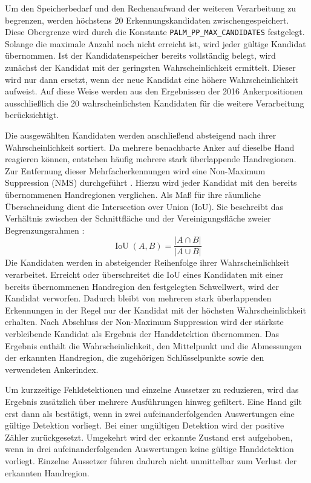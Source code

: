 Um den Speicherbedarf und den Rechenaufwand der weiteren Verarbeitung zu begrenzen, werden höchstens 20 Erkennungskandidaten zwischengespeichert. Diese Obergrenze wird durch die Konstante \texttt{PALM\_PP\_MAX\_CANDIDATES} festgelegt. Solange die maximale Anzahl noch nicht erreicht ist, wird jeder gültige Kandidat übernommen. Ist der Kandidatenspeicher bereits vollständig belegt, wird zunächst der Kandidat mit der geringsten Wahrscheinlichkeit ermittelt. Dieser wird nur dann ersetzt, wenn der neue Kandidat eine höhere Wahrscheinlichkeit aufweist. Auf diese Weise werden aus den Ergebnissen der 2016 Ankerpositionen ausschließlich die 20 wahrscheinlichsten Kandidaten für die weitere Verarbeitung berücksichtigt.

Die ausgewählten Kandidaten werden anschließend absteigend nach ihrer Wahrscheinlichkeit sortiert. Da mehrere benachbarte Anker auf dieselbe Hand reagieren können, entstehen häufig mehrere stark überlappende Handregionen. Zur Entfernung dieser Mehrfacherkennungen wird eine Non-Maximum Suppression (NMS) durchgeführt \cite{bodlaSoftNMSImprovingObject2017}. Hierzu wird jeder Kandidat mit den bereits übernommenen Handregionen verglichen. Als Maß für ihre räumliche Überschneidung dient die Intersection over Union (IoU). Sie beschreibt das Verhältnis zwischen der Schnittfläche und der Vereinigungsfläche zweier Begrenzungsrahmen \cite[S. 3]{rezatofighiGeneralizedIntersectionUnion2019}:
$$ \operatorname{IoU}(A,B) =\frac{\left|A \cap B\right|} {\left|A \cup B\right|} $$
Die Kandidaten werden in absteigender Reihenfolge ihrer Wahrscheinlichkeit verarbeitet. Erreicht oder überschreitet die IoU eines Kandidaten mit einer bereits übernommenen Handregion den festgelegten Schwellwert, wird der Kandidat verworfen. Dadurch bleibt von mehreren stark überlappenden Erkennungen in der Regel nur der Kandidat mit der höchsten Wahrscheinlichkeit erhalten. Nach Abschluss der Non-Maximum Suppression wird der stärkste verbleibende Kandidat als Ergebnis der Handdetektion übernommen. Das Ergebnis enthält die Wahrscheinlichkeit, den Mittelpunkt und die Abmessungen der erkannten Handregion, die zugehörigen Schlüsselpunkte sowie den verwendeten Ankerindex.

Um kurzzeitige Fehldetektionen und einzelne Aussetzer zu reduzieren, wird das Ergebnis zusätzlich über mehrere Ausführungen hinweg gefiltert. Eine Hand gilt erst dann als bestätigt, wenn in zwei aufeinanderfolgenden Auswertungen eine gültige Detektion vorliegt. Bei einer ungültigen Detektion wird der positive Zähler zurückgesetzt. Umgekehrt wird der erkannte Zustand erst aufgehoben, wenn in drei aufeinanderfolgenden Auswertungen keine gültige Handdetektion vorliegt. Einzelne Aussetzer führen dadurch nicht unmittelbar zum Verlust der erkannten Handregion.

